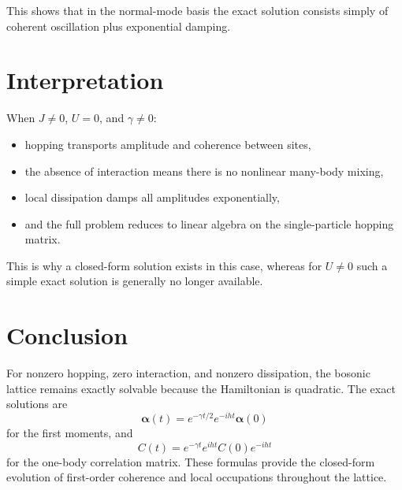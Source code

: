 \documentclass[12pt]{article}
\begin{document}
This shows that in the normal-mode basis the exact solution consists simply of coherent oscillation plus exponential damping.

\section*{Interpretation}
When $J\neq 0$, $U=0$, and $\gamma\neq 0$:
\begin{itemize}
\item hopping transports amplitude and coherence between sites,
\item the absence of interaction means there is no nonlinear many-body mixing,
\item local dissipation damps all amplitudes exponentially,
\item and the full problem reduces to linear algebra on the single-particle hopping matrix.
\end{itemize}

This is why a closed-form solution exists in this case, whereas for $U\neq 0$ such a simple exact solution is generally no longer available.

\section*{Conclusion}
For nonzero hopping, zero interaction, and nonzero dissipation, the bosonic lattice remains exactly solvable because the Hamiltonian is quadratic. The exact solutions are
\[
\bm{\alpha}(t)
=
e^{-\gamma t/2}e^{-iht}\bm{\alpha}(0)
\]
for the first moments, and
\[
C(t)
=
e^{-\gamma t}e^{iht}C(0)e^{-iht}
\]
for the one-body correlation matrix. These formulas provide the closed-form evolution of first-order coherence and local occupations throughout the lattice.
\end{document}
